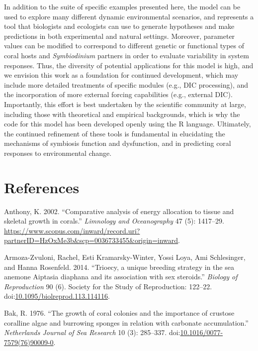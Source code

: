 \documentclass[]{elsarticle} %
\begin{document}
In addition to the suite of specific examples presented here, the model
can be used to explore many different dynamic environmental scenarios,
and represents a tool that biologists and ecologists can use to generate
hypotheses and make predictions in both experimental and natural
settings. Moreover, parameter values can be modified to correspond to
different genetic or functional types of coral hosts and
\emph{Symbiodinium} partners in order to evaluate variability in system
responses. Thus, the diversity of potential applications for this model
is high, and we envision this work as a foundation for continued
development, which may include more detailed treatments of specific
modules (e.g., DIC processing), and the incorporation of more external
forcing capabilities (e.g., external DIC). Importantly, this effort is
best undertaken by the scientific community at large, including those
with theoretical and empirical backgrounds, which is why the code for
this model has been developed openly using the R language. Ultimately,
the continued refinement of these tools is fundamental in elucidating
the mechanisms of symbiosis function and dysfunction, and in predicting
coral responses to environmental change.

\section*{References}\label{references}

\hypertarget{refs}{}
\hypertarget{ref-Anthony:2002tc}{}
Anthony, K. 2002. ``Comparative analysis of energy allocation to tissue
and skeletal growth in corals.'' \emph{Limnology and Oceanography} 47
(5): 1417--29.
\url{https://www.scopus.com/inward/record.uri?partnerID=HzOxMe3b\&scp=0036733455\&origin=inward}.

\hypertarget{ref-ArmozaZvuloni:2014ju}{}
Armoza-Zvuloni, Rachel, Esti Kramarsky-Winter, Yossi Loya, Ami
Schlesinger, and Hanna Rosenfeld. 2014. ``Trioecy, a unique breeding
strategy in the sea anemone Aiptasia diaphana and its association with
sex steroids.'' \emph{Biology of Reproduction} 90 (6). Society for the
Study of Reproduction: 122--22.
doi:\href{https://doi.org/10.1095/biolreprod.113.114116}{10.1095/biolreprod.113.114116}.

\hypertarget{ref-Bak:1976bv}{}
Bak, R. 1976. ``The growth of coral colonies and the importance of
crustose coralline algae and burrowing sponges in relation with
carbonate accumulation.'' \emph{Netherlands Journal of Sea Research} 10
(3): 285--337.
doi:\href{https://doi.org/10.1016/0077-7579(76)90009-0}{10.1016/0077-7579(76)90009-0}.
\end{document}
